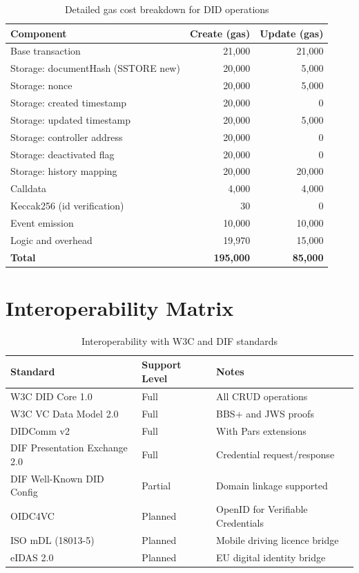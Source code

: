 \documentclass[11pt,a4paper]{article}
\begin{document}
\begin{table}[h]
\centering
\caption{Detailed gas cost breakdown for DID operations}
\label{tab:gas-breakdown}
\begin{tabular}{lrr}
\toprule
\textbf{Component} & \textbf{Create (gas)} & \textbf{Update (gas)} \\
\midrule
Base transaction & 21{,}000 & 21{,}000 \\
Storage: documentHash (SSTORE new) & 20{,}000 & 5{,}000 \\
Storage: nonce & 20{,}000 & 5{,}000 \\
Storage: created timestamp & 20{,}000 & 0 \\
Storage: updated timestamp & 20{,}000 & 5{,}000 \\
Storage: controller address & 20{,}000 & 0 \\
Storage: deactivated flag & 20{,}000 & 0 \\
Storage: history mapping & 20{,}000 & 20{,}000 \\
Calldata & 4{,}000 & 4{,}000 \\
Keccak256 (id verification) & 30 & 0 \\
Event emission & 10{,}000 & 10{,}000 \\
Logic and overhead & 19{,}970 & 15{,}000 \\
\midrule
\textbf{Total} & \textbf{195{,}000} & \textbf{85{,}000} \\
\bottomrule
\end{tabular}
\end{table}

\section{Interoperability Matrix}
\label{app:interop}

\begin{table}[h]
\centering
\caption{Interoperability with W3C and DIF standards}
\label{tab:interop}
\begin{tabular}{lll}
\toprule
\textbf{Standard} & \textbf{Support Level} & \textbf{Notes} \\
\midrule
W3C DID Core 1.0 & Full & All CRUD operations \\
W3C VC Data Model 2.0 & Full & BBS+ and JWS proofs \\
DIDComm v2 & Full & With Pars extensions \\
DIF Presentation Exchange 2.0 & Full & Credential request/response \\
DIF Well-Known DID Config & Partial & Domain linkage supported \\
OIDC4VC & Planned & OpenID for Verifiable Credentials \\
ISO mDL (18013-5) & Planned & Mobile driving licence bridge \\
eIDAS 2.0 & Planned & EU digital identity bridge \\
\bottomrule
\end{tabular}
\end{table}
\end{document}
